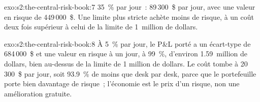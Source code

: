 \begin{solution}{exo:s2:the-central-risk-book:7}
35~\% par jour~: 89\,300~\$ par jour, avec une valeur en risque de 449\,000~\$. Une limite plus stricte achète moins de risque, à un coût deux fois supérieur à celui de la limite de 1~million de dollars.
\end{solution}

\begin{solution}{exo:s2:the-central-risk-book:8}
À 5~\% par jour, le P\&L porté a un écart-type de 684\,000~\$ et une valeur en risque à un jour, à 99~\%, d'environ 1.59~million de dollars, bien au-dessus de la limite de 1
million de dollars. Le coût tombe à 20\,300~\$ par jour, soit 93.9~\% de moins que desk par desk, parce que le portefeuille porte bien davantage de risque~; l'économie est le prix d'un risque,
non une amélioration gratuite.
\end{solution}

